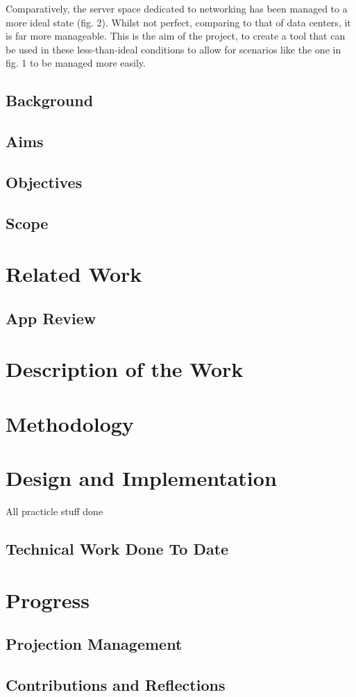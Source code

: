 \documentclass [12pt,letterpaper]{article}
\begin{document}
Comparatively, the server space dedicated to networking has been managed to a more ideal state (fig. 2). Whilst not perfect, comparing to that of data centers, it is far more manageable. This is the aim of the project, to create a tool that can be used in these less-than-ideal conditions to allow for scenarios like the one in fig. 1 to be managed more easily.


\subsection{Background}
\label{sec:background}
\subsection{Aims}
\label{sec:aims}
\subsection{Objectives}
\label{sec:objectives}
\subsection{Scope}
\label{sec:scope}
\section{Related Work}
\subsection{App Review}
\section{Description of the Work}

\section{Methodology}
\section{Design and Implementation}
All practicle stuff done
\subsection{Technical Work Done To Date}

\section{Progress}
\subsection{Projection Management}
\subsection{Contributions and Reflections}

\pagebreak

 
\end{document}
